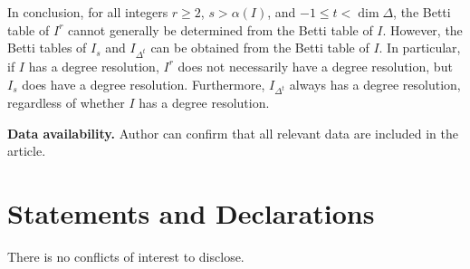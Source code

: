 \documentclass[a4paper,12pt]{amsart}
\numberwithin{equation}{section}
\theoremstyle{definition}
\begin{document}
In conclusion, for all integers $r\ge2$, $s>\alpha(I)$, and $-1\leq t<\dim\Delta$, the Betti table of $I^r$ cannot generally be determined from the Betti table of $I$. However, the Betti tables of $I_s$ and $I_{\Delta^t}$ can be obtained from the Betti table of $I$. In particular, if $I$ has a degree resolution, $I^r$ does not necessarily have a degree resolution, but $I_s$ does have a degree resolution. Furthermore, $I_{\Delta^t}$ always has a degree resolution, regardless of whether $I$ has a degree resolution.



\textbf{Data availability.} Author can confirm that all relevant data are included in the article.

\section{Statements and Declarations}
There is no conflicts of interest to disclose.



\end{document}
